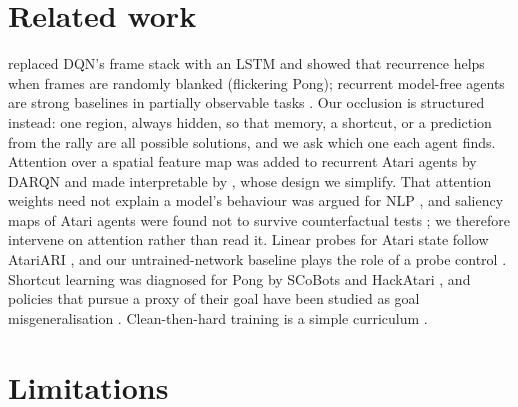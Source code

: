 \documentclass[11pt]{article}
\begin{document}
\section{Related work}

\citet{hausknecht2015drqn} replaced DQN's frame stack with an LSTM and showed that recurrence helps when frames
are randomly blanked (flickering Pong); recurrent model-free agents are strong baselines in partially
observable tasks \citep{ni2022recurrent}. Our occlusion is structured instead: one region, always hidden, so
that memory, a shortcut, or a prediction from the rally are all possible solutions, and we ask which one each
agent finds. Attention over a spatial feature map was added to recurrent Atari agents by DARQN
\citep{sorokin2015darqn} and made interpretable by \citet{mott2019attention}, whose design we simplify. That
attention weights need not explain a model's behaviour was argued for NLP \citep{jain2019attention}, and
saliency maps of Atari agents were found not to survive counterfactual tests \citep{atrey2020exploratory}; we
therefore intervene on attention rather than read it. Linear probes for Atari state follow AtariARI
\citep{anand2019atariari}, and our untrained-network baseline plays the role of a probe control
\citep{hewitt2019control}. Shortcut learning \citep{geirhos2020shortcut} was diagnosed for Pong by SCoBots
\citep{delfosse2024scobots} and HackAtari \citep{delfosse2024hackatari}, and policies that pursue a proxy of
their goal have been studied as goal misgeneralisation \citep{langosco2022goal}. Clean-then-hard training is a
simple curriculum \citep{bengio2009curriculum}.

\section{Limitations}
\end{document}
